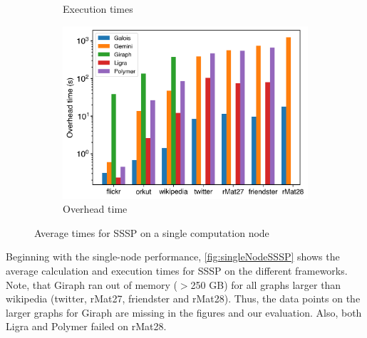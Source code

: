 \begin{figure}
\begin{subfigure}{0.32\textwidth}
		\caption{Execution times}
		\label{fig:singleNodeSSSP_exec}
	\end{subfigure}
	\hfil
	\begin{subfigure}{0.32\textwidth}
		\includegraphics[width=\linewidth]{../../plots/singleNodeSSSP_overheadTime.png}
		\caption{Overhead time}
		\label{fig:singleNodeSSSP_overhead}
	\end{subfigure}
	\caption{Average times for SSSP on a single computation node}
	\label{fig:singleNodeSSSP}
\end{figure}
Beginning with the single-node performance, \autoref{fig:singleNodeSSSP} shows the average calculation and execution times for SSSP on the different frameworks.
Note, that Giraph ran out of memory ($>$250 GB) for all graphs larger than wikipedia (twitter, rMat27, friendster and rMat28). Thus, the data points on the larger graphs for Giraph are missing in the figures and our evaluation. 
Also, both Ligra and Polymer failed on rMat28.


